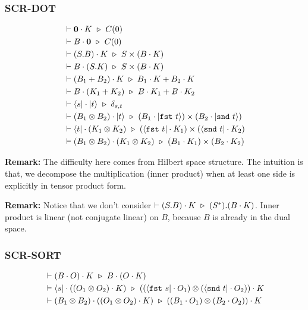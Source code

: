 \subsubsection*{\textsf{SCR-DOT}}
\begin{align*}
  & \vdash \mathbf{0} \cdot K \ \triangleright\  C(0) \\
  & \vdash B \cdot \mathbf{0} \ \triangleright\  C(0) \\
  & \vdash (S.B) \cdot K \ \triangleright\  S \times (B \cdot K) \\
  & \vdash B \cdot (S.K) \ \triangleright\  S \times (B \cdot K) \\
  & \vdash (B_1 + B_2) \cdot K \ \triangleright\  B_1 \cdot K + B_2 \cdot K \\
  & \vdash B \cdot (K_1 + K_2) \ \triangleright\  B \cdot K_1 + B \cdot K_2 \\
  & \vdash \langle s| \cdot |t\rangle \ \triangleright\  \delta_{s, t} \\
  & \vdash (B_1 \otimes B_2) \cdot |t\rangle \ \triangleright\  (B_1 \cdot |\texttt{fst}\ t\rangle) \times (B_2 \cdot |\texttt{snd}\ t\rangle) \\
  & \vdash \langle t| \cdot (K_1 \otimes K_2) \ \triangleright\  (\langle \texttt{fst}\ t| \cdot K_1) \times (\langle \texttt{snd}\ t| \cdot K_2) \\
  & \vdash (B_1 \otimes B_2) \cdot (K_1 \otimes K_2) \ \triangleright\  (B_1 \cdot K_1) \times (B_2 \cdot K_2)
\end{align*}

\textbf{Remark: } The difficulty here comes from Hilbert space structure. The intuition is that, we decompose the multiplication (inner product) when at least one side is explicitly in tensor product form.

\textbf{Remark:} Notice that we don't consider $\vdash (S.B) \cdot K \ \triangleright\  (S^*).(B \cdot K)$. Inner product is linear (not conjugate linear) on $B$, because $B$ is already in the dual space.

\subsubsection*{\textsf{SCR-SORT}}
\begin{align*}
  & \vdash (B \cdot O) \cdot K \ \triangleright\  B \cdot (O \cdot K) \\
  & \vdash \langle s| \cdot ((O_1 \otimes O_2) \cdot K) \ \triangleright\  ((\langle \texttt{fst}\ s| \cdot O_1) \otimes (\langle \texttt{snd}\ t| \cdot O_2)) \cdot K \\
  & \vdash (B_1 \otimes B_2) \cdot ((O_1 \otimes O_2) \cdot K) \ \triangleright\  ((B_1 \cdot O_1) \otimes (B_2 \cdot O_2)) \cdot K \\
\end{align*}


